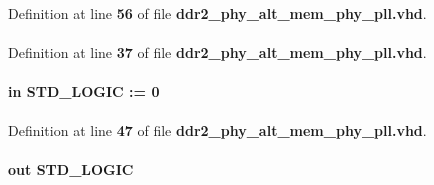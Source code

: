 Definition at line {\bf 56} of file {\bf ddr2\+\_\+phy\+\_\+alt\+\_\+mem\+\_\+phy\+\_\+pll.\+vhd}.

\paragraph[{ieee}]{\hspace{0.3cm}{\ttfamily [Library]}}\label{classddr2__phy__alt__mem__phy__pll_a0a6af6eef40212dbaf130d57ce711256}


Definition at line {\bf 37} of file {\bf ddr2\+\_\+phy\+\_\+alt\+\_\+mem\+\_\+phy\+\_\+pll.\+vhd}.

\paragraph[{inclk0}]{ {\bfseries \textcolor{keywordflow}{in}\textcolor{vhdlchar}{ }} {\bfseries \textcolor{comment}{S\+T\+D\+\_\+\+L\+O\+G\+IC}\textcolor{vhdlchar}{ }\textcolor{vhdlchar}{ }\textcolor{vhdlchar}{\+:}\textcolor{vhdlchar}{=}\textcolor{vhdlchar}{ }\textcolor{vhdlchar}{ }\textcolor{vhdlchar}{\textquotesingle{}}\textcolor{vhdlchar}{ } \textcolor{vhdldigit}{0} \textcolor{vhdlchar}{ }\textcolor{vhdlchar}{\textquotesingle{}}\textcolor{vhdlchar}{ }} \hspace{0.3cm}{\ttfamily [Port]}}\label{classddr2__phy__alt__mem__phy__pll_a9463f4cc62782c2faac516c942dcb5db}


Definition at line {\bf 47} of file {\bf ddr2\+\_\+phy\+\_\+alt\+\_\+mem\+\_\+phy\+\_\+pll.\+vhd}.

\paragraph[{locked}]{ {\bfseries \textcolor{keywordflow}{out}\textcolor{vhdlchar}{ }} {\bfseries \textcolor{comment}{S\+T\+D\+\_\+\+L\+O\+G\+IC}\textcolor{vhdlchar}{ }} \hspace{0.3cm}{\ttfamily [Port]}}\label{classddr2__phy__alt__mem__phy__pll_ab33e72e8245db404191648e9a25344eb}


